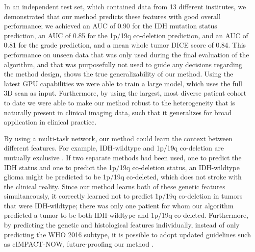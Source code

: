 In an independent test set, which contained data from 13 different institutes, we demonstrated that our method predicts these features with good overall performance; we achieved an \gls{AUC} of 0.90 for the \gls{IDH} mutation status prediction, an \gls{AUC} of 0.85 for the 1p/19q co-deletion prediction, and an \gls{AUC} of 0.81 for the grade prediction, and a mean whole \gls{tumor} DICE score of 0.84.
This performance on unseen data that was only used during the final evaluation of the algorithm, and that was purposefully not used to guide any decisions regarding the method design, shows the true generalizability of our method.
Using the latest GPU capabilities we were able to train a large model, which uses the full 3D scan as input.
Furthermore, by using the largest, most diverse patient cohort to date we were able to make our method robust to the heterogeneity that is naturally present in clinical imaging data, such that it generalizes for broad application in clinical practice.

By using a multi-task network, our method could learn the context between different features.
For example, \gls{IDH}-wildtype and 1p/19q co-deletion are mutually exclusive \autocite{labussi20101p19qcodeletedIDH}.
If two separate methods had been used, one to predict the \gls{IDH} status and one to predict the 1p/19q co-deletion status, an \gls{IDH}-wildtype glioma might be predicted to be 1p/19q co-deleted, which does not stroke with the clinical reality.
Since our method learns both of these genetic features simultaneously, it correctly learned not to predict 1p/19q co-deletion in \glspl{tumor} that were \gls{IDH}-wildtype; there was only one patient for whom our algorithm predicted a \gls{tumor} to be both \gls{IDH}-wildtype and 1p/19q co-deleted.
Furthermore, by predicting the genetic and histological features individually, instead of only predicting the \gls{WHO} 2016 subtype, it is possible to adopt updated guidelines such as cIMPACT-NOW, future-proofing our method \autocite{lous2020impactnow}.


